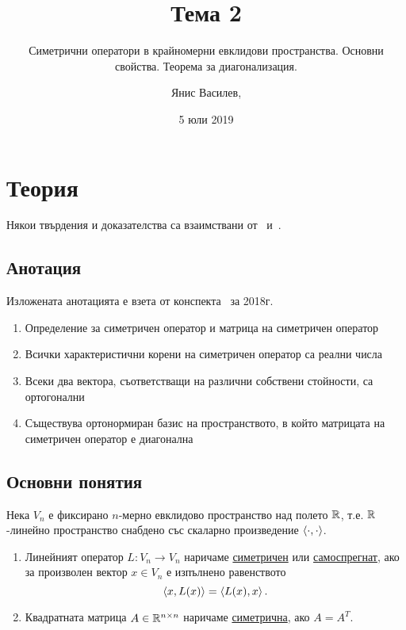 \documentclass[numbers=endperiod, DIV=15, bibliography=totocnumbered]{scrartcl}
\title{Тема 2}
\subtitle{Симетрични оператори в крайномерни евклидови пространства. Основни свойства. Теорема за диагонализация.}
\author{Янис Василев, \Email{ianis@ivasilev.net}}
\date{5 юли 2019}
\begin{document}
\maketitle

\section{Теория}

Някои твърдения и доказателства са взаимствани от~\cite{Knapp} и~\cite{RoyachkiNotes}.

\subsection{Анотация}

Изложената анотацията е взета от конспекта~\cite{Syllabus} за 2018г.

\begin{enumerate}
  \item Определение за симетричен оператор и матрица на симетричен оператор
  \item Всички характеристични корени на симетричен оператор са реални числа
  \item Всеки два вектора, съответстващи на различни собствени стойности, са ортогонални
  \item Съществува ортонормиран базис на пространството, в който матрицата на симетричен оператор е диагонална
\end{enumerate}

\subsection{Основни понятия}

Нека $V_n$ е фиксирано $n$-мерно евклидово пространство над полето $\mathbb{R}$, т.е. $\mathbb{R}$-линейно пространство снабдено със скаларно произведение $\left\langle \cdot, \cdot \right\rangle$.

\begin{definition}
  \mbox{}
  \begin{enumerate}
    \item Линейният оператор $L: V_n \to V_n$ наричаме \uline{симетричен} или \uline{самоспрегнат}, ако за произволен вектор $x \in V_n$ е изпълнено равенството
    \begin{displaymath}
      \left\langle x, L(x) \right\rangle = \left\langle L(x), x \right\rangle.
    \end{displaymath}

    \item Квадратната матрица $A \in \mathbb{R}^{n \times n}$ наричаме \uline{симетрична}, ако $A = A^T$.
  \end{enumerate}
\end{definition}
\end{document}

